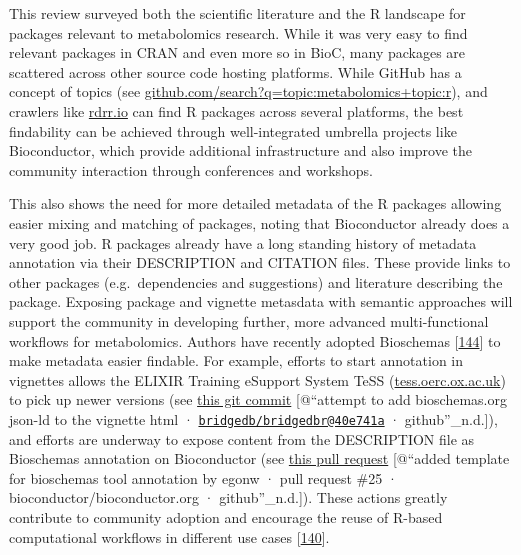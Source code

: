 \documentclass[]{article}
\begin{document}
This review surveyed both the scientific literature and the R landscape for packages relevant to metabolomics research. While it was very easy to find relevant packages in CRAN and even more so in BioC, many packages are scattered across other source code hosting platforms. While GitHub has a concept of topics (see \href{https://github.com/search?q=topic:metabolomics+topic:r}{github.com/search?q=topic:metabolomics+topic:r}), and crawlers like \href{https://rdrr.io/}{rdrr.io} can find R packages across several platforms, the best findability can be achieved through well-integrated umbrella projects like Bioconductor, which provide additional infrastructure and also improve the community interaction through conferences and workshops.

This also shows the need for more detailed metadata of the R packages allowing easier mixing and matching of packages, noting that Bioconductor already does a very good job. R packages already have a long standing history of metadata annotation via their DESCRIPTION and CITATION files. These provide links to other packages (e.g.~dependencies and suggestions) and literature describing the package. Exposing package and vignette metasdata with semantic approaches will support the community in developing further, more advanced multi-functional workflows for metabolomics. Authors have recently adopted Bioschemas {[}\protect\hyperlink{ref-gray_2017}{144}{]} to make metadata easier findable. For example, efforts to start annotation in vignettes allows the ELIXIR Training eSupport System TeSS (\href{https://tess.oerc.ox.ac.uk}{tess.oerc.ox.ac.uk}) to pick up newer versions (see \href{https://github.com/bridgedb/BridgeDbR/commit/40e741aed77765572e77f84f9fea0e0fb511d3f0}{this git commit} {[}@``attempt to add bioschemas.org json-ld to the vignette html · \href{mailto:bridgedb/bridgedbr@40e741a}{\nolinkurl{bridgedb/bridgedbr@40e741a}} · github''\_n.d.{]}), and efforts are underway to expose content from the DESCRIPTION file as Bioschemas annotation on Bioconductor (see \href{https://github.com/Bioconductor/bioconductor.org/pull/25}{this pull request} {[}@``added template for bioschemas tool annotation by egonw · pull request \#25 · bioconductor/bioconductor.org · github''\_n.d.{]}). These actions greatly contribute to community adoption and encourage the reuse of R-based computational workflows in different use cases {[}\protect\hyperlink{ref-goble_2019}{140}{]}.
\end{document}
